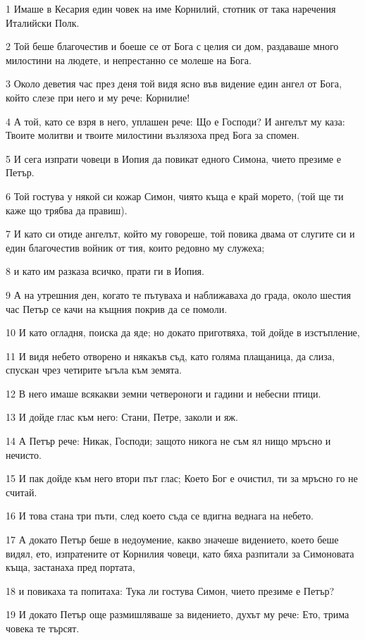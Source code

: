 \par 1 Имаше в Кесария един човек на име Корнилий, стотник от така наречения Италийски Полк.
\par 2 Той беше благочестив и боеше се от Бога с целия си дом, раздаваше много милостини на людете, и непрестанно се молеше на Бога.
\par 3 Около деветия час през деня той видя ясно във видение един ангел от Бога, който слезе при него и му рече: Корнилие!
\par 4 А той, като се взря в него, уплашен рече: Що е Господи? И ангелът му каза: Твоите молитви и твоите милостини възлязоха пред Бога за спомен.
\par 5 И сега изпрати човеци в Иопия да повикат едного Симона, чието презиме е Петър.
\par 6 Той гостува у някой си кожар Симон, чиято къща е край морето, (той ще ти каже що трябва да правиш).
\par 7 И като си отиде ангелът, който му говореше, той повика двама от слугите си и един благочестив войник от тия, които редовно му служеха;
\par 8 и като им разказа всичко, прати ги в Иопия.
\par 9 А на утрешния ден, когато те пътуваха и наближаваха до града, около шестия час Петър се качи на къщния покрив да се помоли.
\par 10 И като огладня, поиска да яде; но докато приготвяха, той дойде в изстъпление,
\par 11 И видя небето отворено и някакъв съд, като голяма плащаница, да слиза, спускан чрез четирите ъгъла към земята.
\par 12 В него имаше всякакви земни четвероноги и гадини и небесни птици.
\par 13 И дойде глас към него: Стани, Петре, заколи и яж.
\par 14 А Петър рече: Никак, Господи; защото никога не съм ял нищо мръсно и нечисто.
\par 15 И пак дойде към него втори път глас; Което Бог е очистил, ти за мръсно го не считай.
\par 16 И това стана три пъти, след което съда се вдигна веднага на небето.
\par 17 А докато Петър беше в недоумение, какво значеше видението, което беше видял, ето, изпратените от Корнилия човеци, като бяха разпитали за Симоновата къща, застанаха пред портата,
\par 18 и повикаха та попитаха: Тука ли гостува Симон, чието презиме е Петър?
\par 19 И докато Петър още размишляваше за видението, духът му рече: Ето, трима човека те търсят.
